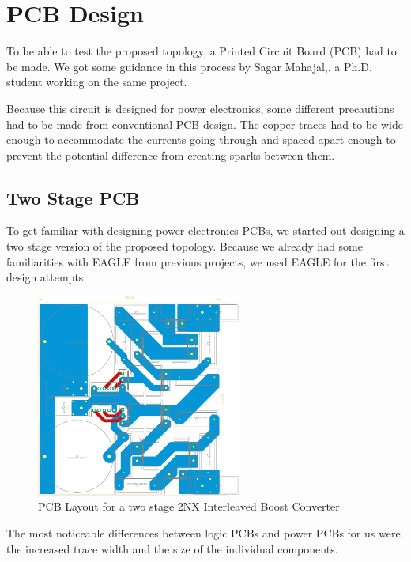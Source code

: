 \section{PCB Design}\label{sec:PCB}

To be able to test the proposed topology,
a Printed Circuit Board (PCB) had to be made.
We got some guidance in this process by Sagar Mahajal,.
a Ph.D. student working on the same project.

Because this circuit is designed for power electronics,
some different precautions had to be made from conventional PCB design.
The copper traces had to be wide enough to accommodate the currents going through
and spaced apart enough to prevent the potential difference from creating sparks between them.

\subsection{Two Stage PCB}
To get familiar with designing power electronics PCBs,
we started out designing a two stage version of the proposed topology.
Because we already had some familiarities with EAGLE from previous projects,
we used EAGLE for the first design attempts.

\begin{figure}[H]
	\begin{center}
	\includegraphics[width=0.6\textwidth]{figures/05cPCBdesign/2NX_interleaved_boost_converter_EAGLE_BY_DANIEL.pdf}
	\end{center}
	\caption{PCB Layout for a two stage 2NX Interleaved Boost Converter}
	\label{fig:2nxeagle}
\end{figure}

The most noticeable differences between logic PCBs and power PCBs for us were
the increased trace width and the size of the individual components.

